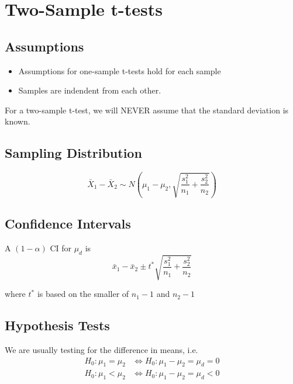 \documentclass[
  letterpaper,
  DIV=11,
  numbers=noendperiod]{scrreprt}
\providecommand{\tightlist}{%
  \setlength{\itemsep}{0pt}\setlength{\parskip}{0pt}}\usepackage{longtable,booktabs,array}
\begin{document}
\hypertarget{two-sample-t-tests-1}{%
\section{Two-Sample t-tests}\label{two-sample-t-tests-1}}

\hypertarget{assumptions-4}{%
\subsection{Assumptions}\label{assumptions-4}}

\begin{itemize}
\tightlist
\item
  Assumptions for one-sample t-tests hold for each sample
\item
  Samples are indendent from each other.
\end{itemize}

For a two-sample t-test, we will NEVER assume that the standard
deviation is known.

\hypertarget{sampling-distribution-2}{%
\subsection{Sampling Distribution}\label{sampling-distribution-2}}

\[
\bar X_1 - \bar X_2 \sim N\left(\mu_1 - \mu_2, \sqrt{\frac{s_1^2}{n_1} + \frac{s_2^2}{n_2}}\right)
\]

\hypertarget{confidence-intervals-4}{%
\subsection{Confidence Intervals}\label{confidence-intervals-4}}

A \((1-\alpha)\) CI for \(\mu_d\) is \[
\bar x_1 - \bar x_2 \pm t^*\sqrt{\frac{s_1^2}{n_1} + \frac{s_2^2}{n_2}}
\]

where \(t^*\) is based on the smaller of \(n_1 - 1\) and \(n_2 - 1\)

\hypertarget{hypothesis-tests}{%
\subsection{Hypothesis Tests}\label{hypothesis-tests}}

We are usually testing for the difference in means, i.e. \begin{align*}
H_0: \mu_1 = \mu_2 &\Leftrightarrow H_0:\mu_1 - \mu_2 = \mu_d = 0\\
H_0: \mu_1 < \mu_2 &\Leftrightarrow H_0:\mu_1 - \mu_2 = \mu_d < 0\\
\end{align*}\vspace{-15mm}
\end{document}
